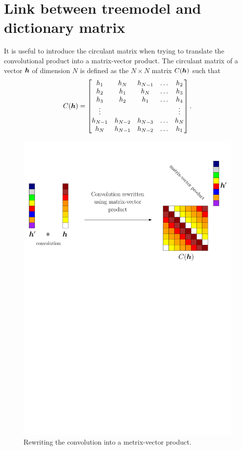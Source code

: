 \FloatBarrier
\section{Link between \gls{treemodel} and dictionary matrix}\label{sec_matrix_vs_tree} 

It is useful to introduce the circulant matrix when trying to translate the convolutional product into a matrix-vector product. The circulant matrix of a vector $\bm{h}$ of dimension $N$ is defined as the $N \times N$ matrix $C(\bm{h})$ such that
\begin{equation*}C(\bm{h}) = 
	\begin{bmatrix}
		h_1     & h_{N}   & h_{N-1} & \dots & h_{2} \\
		h_2     & h_{1}   & h_{N}   & \dots & h_{3} \\
		h_3     & h_{2}   & h_{1}   & \dots & h_{4} \\
		\vdots  &         &         &       & \vdots \\
		h_{N-1} & h_{N-2} & h_{N-3} & \dots & h_{N} \\
		h_N     & h_{N-1} & h_{N-2} & \dots & h_{1} \\
	\end{bmatrix}
.\end{equation*}

\begin{figure}[!ht] \centering
\includegraphics[width=\textwidth]{figures/block-circulant_matrix.pdf}
\caption{Rewriting the convolution into a metrix-vector product.}\label{fig_block_circular}
\end{figure}

